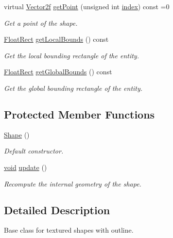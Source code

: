 \begin{DoxyCompactItemize}
virtual \hyperlink{namespacesf_acf03098c2577b869e2fa6836cc48f1a0}{Vector2f} \hyperlink{classsf_1_1_shape_a397f3b4cdb7ad98cdc6c034816c652d2}{get\-Point} (unsigned int \hyperlink{gl3_8h_a57f14e05b1900f16a2da82ade47d0c6d}{index}) const =0
\begin{DoxyCompactList}\small\item\em Get a point of the shape. \end{DoxyCompactList}\item 
\hyperlink{namespacesf_aed4e58f586b2eed2621c0365d0b7554e}{Float\-Rect} \hyperlink{classsf_1_1_shape_a5d26a18ccfe850ff8d327ca97edbc34a}{get\-Local\-Bounds} () const 
\begin{DoxyCompactList}\small\item\em Get the local bounding rectangle of the entity. \end{DoxyCompactList}\item 
\hyperlink{namespacesf_aed4e58f586b2eed2621c0365d0b7554e}{Float\-Rect} \hyperlink{classsf_1_1_shape_a5257341fe832884dbba6b9dc855e33cc}{get\-Global\-Bounds} () const 
\begin{DoxyCompactList}\small\item\em Get the global bounding rectangle of the entity. \end{DoxyCompactList}\end{DoxyCompactItemize}
\subsection*{Protected Member Functions}
\begin{DoxyCompactItemize}
\item 
\hyperlink{classsf_1_1_shape_a413a457f720835b9f5d8e97ca8b80960}{Shape} ()
\begin{DoxyCompactList}\small\item\em Default constructor. \end{DoxyCompactList}\item 
\hyperlink{glutf90_8h_ac778d6f63f1aaf8ebda0ce6ac821b56e}{void} \hyperlink{classsf_1_1_shape_adfb2bd966c8edbc5d6c92ebc375e4ac1}{update} ()
\begin{DoxyCompactList}\small\item\em Recompute the internal geometry of the shape. \end{DoxyCompactList}\end{DoxyCompactItemize}


\subsection{Detailed Description}
Base class for textured shapes with outline. 

